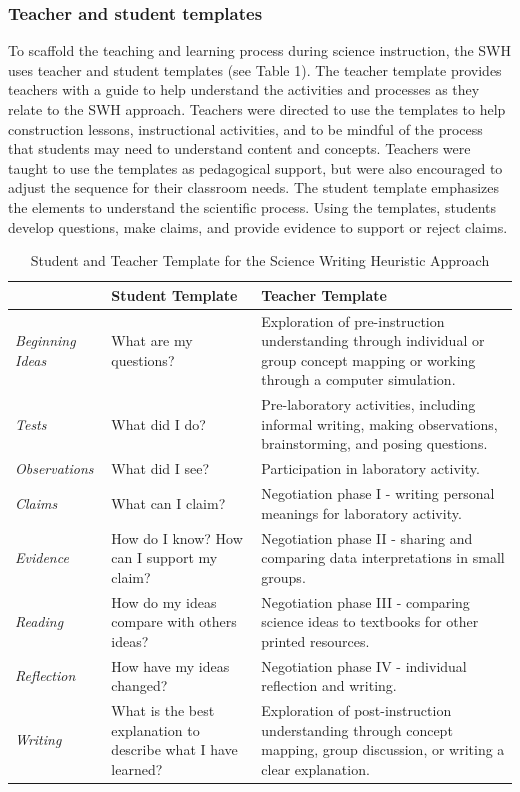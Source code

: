 \documentclass[11.5pt]{sig-alternate} %
\begin{document}
\begin{large}
\subsubsection*{Teacher and student templates}
To scaffold the teaching and learning process during science instruction, the SWH uses teacher and student templates (see Table 1).  The teacher template provides teachers with a guide to help understand the activities and processes as they relate to the SWH approach. Teachers were directed to use the templates to help construction lessons, instructional activities, and to be mindful of the process that students may need to understand content and concepts.  Teachers were taught to use the templates as pedagogical support, but were also encouraged to adjust the sequence for their classroom needs.  The student template emphasizes the elements to understand the scientific process.  Using the templates, students develop questions, make claims, and provide evidence to support or reject claims.  

\begin{table}[!htbp]
\caption{Student and Teacher Template for the Science Writing Heuristic Approach}
\begin{tabular}{lll}
\hline
 & \textbf{Student Template} & \textbf{Teacher Template} \\ \hline
\textit{Beginning Ideas} & What are my questions? & Exploration of pre-instruction understanding through individual or group concept mapping or working through a computer simulation. \\ \hline
\textit{Tests} & What did I do? & Pre-laboratory activities, including informal writing, making observations, brainstorming, and posing questions. \\ \hline
\textit{Observations} & What did I see? & Participation in laboratory activity. \\ \hline
\textit{Claims} & What can I claim? & Negotiation phase I - writing personal meanings for laboratory activity. \\ \hline
\textit{Evidence} & How do I know? How can I support my claim? & Negotiation phase II - sharing and comparing data interpretations in small groups. \\ \hline
\textit{Reading} & How do my ideas compare with others ideas? & Negotiation phase III - comparing science ideas to textbooks for other printed resources. \\ \hline
\textit{Reflection} & How have my ideas changed? & Negotiation phase IV - individual reflection and writing. \\ \hline
\textit{Writing} & What is the best explanation to describe what I have learned? & Exploration of post-instruction understanding through concept mapping, group discussion, or writing a clear explanation. \\ \hline
\end{tabular}
\end{table}


\end{large}
\end{document}
